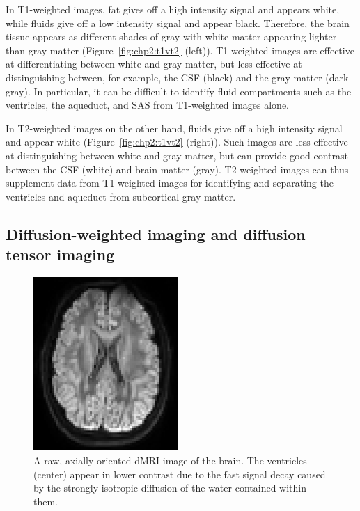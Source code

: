 In T1-weighted images, fat gives off a high intensity signal and
appears white, while fluids give off a low intensity signal and appear
black. Therefore, the brain tissue appears as different shades of gray
with white matter appearing lighter than gray matter
(Figure~\ref{fig:chp2:t1vt2} (left)). T1-weighted images are effective
at differentiating between white and gray matter, but less effective
at distinguishing between, for example, the CSF (black) and the gray
matter (dark gray). In particular, it can be difficult to identify
fluid compartments such as the ventricles, the aqueduct, and SAS from
T1-weighted images alone.

%
%
In T2-weighted images on the other hand, fluids give off a high
intensity signal and appear white (Figure~\ref{fig:chp2:t1vt2}
(right)). Such images are less effective at distinguishing between
white and gray matter, but can provide good contrast between the CSF
(white) and brain matter (gray). T2-weighted images can thus
supplement data from T1-weighted images for identifying and separating
the ventricles and aqueduct from subcortical gray matter.

\subsection{Diffusion-weighted imaging and diffusion tensor imaging}

\begin{figure}
  \sidecaption
  \centering
  \includegraphics[width=0.49\textwidth]{./graphics/chp2/DTI-slice-image-crop.png}
\caption{A raw, axially-oriented dMRI image of the brain. The 
ventricles (center) appear in lower contrast due to the fast signal decay 
caused by the strongly isotropic diffusion of the water contained within them.} 
\label{fig:chp2:dti}
\end{figure}

